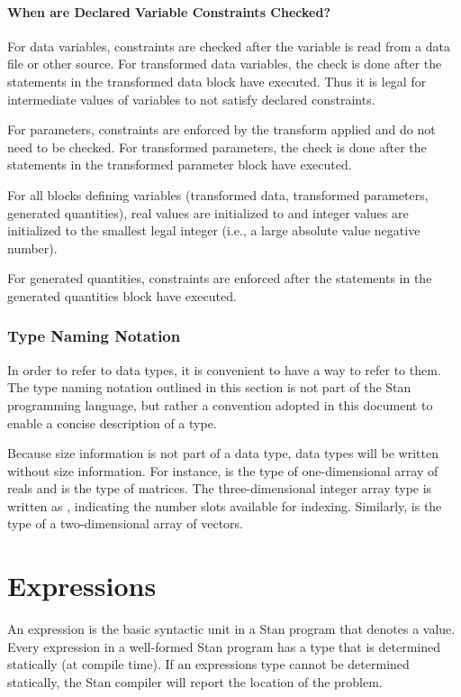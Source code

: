 \subsubsection{When are Declared Variable Constraints Checked?}

For data variables, constraints are checked after the variable is read
from a data file or other source.  For transformed data variables, the
check is done after the statements in the transformed data block have
executed.  Thus it is legal for intermediate values of variables to
not satisfy declared constraints.

For parameters, constraints are enforced by the transform applied and
do not need to be checked.  For transformed parameters, the check is
done after the statements in the transformed parameter block have
executed.

For all blocks defining variables (transformed data, transformed
parameters, generated quantities), real values are initialized to
 and integer values are initialized to the smallest legal
integer (i.e., a large absolute value negative number).

For generated quantities, constraints are enforced after the
statements in the generated quantities block have executed.


\subsection{Type Naming Notation}

In order to refer to data types, it is convenient to have a way to
refer to them.  The type naming notation outlined in this section is
not part of the Stan programming language, but rather a convention
adopted in this document to enable a concise description of a type.

Because size information is not part of a data type, data
types will be written without size information.  For instance,
 is the type of one-dimensional array of reals and
 is the type of matrices.  The three-dimensional integer
array type is written as , indicating the number slots
available for indexing.  Similarly,  is the type of a
two-dimensional array of vectors.


\chapter{Expressions}

\noindent
An expression is the basic syntactic unit in a Stan program that
denotes a value.  Every expression in a well-formed Stan program has
a type that is determined statically (at compile time).  If an
expressions type cannot be determined statically, the Stan compiler
will report the location of the problem.

